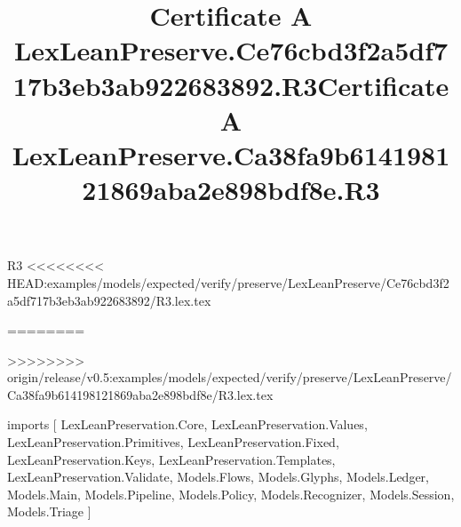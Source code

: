 \begin{lexlean}{R3}
<<<<<<<< HEAD:examples/models/expected/verify/preserve/LexLeanPreserve/Ce76cbd3f2a5df717b3eb3ab922683892/R3.lex.tex
\title{Certificate A LexLeanPreserve.Ce76cbd3f2a5df717b3eb3ab922683892.R3}
========
\title{Certificate A LexLeanPreserve.Ca38fa9b614198121869aba2e898bdf8e.R3}
>>>>>>>> origin/release/v0.5:examples/models/expected/verify/preserve/LexLeanPreserve/Ca38fa9b614198121869aba2e898bdf8e/R3.lex.tex
\begin{coremodule}
imports [
  LexLeanPreservation.Core,
  LexLeanPreservation.Values,
  LexLeanPreservation.Primitives,
  LexLeanPreservation.Fixed,
  LexLeanPreservation.Keys,
  LexLeanPreservation.Templates,
  LexLeanPreservation.Validate,
  Models.Flows,
  Models.Glyphs,
  Models.Ledger,
  Models.Main,
  Models.Pipeline,
  Models.Policy,
  Models.Recognizer,
  Models.Session,
  Models.Triage
]


\end{coremodule}
\end{lexlean}
